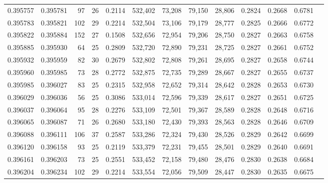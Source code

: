 \begin{tabular}{rrrrrrrrrrrrr}
0.395757 & 0.395781 &    97 &  26 &                                     0.2114 & 532,402 &  73,208 &  79,150 &  28,806 & 0.2824 & 0.2668 & 0.6781 \\
0.395783 & 0.395821 &   102 &  29 &                                     0.2214 & 532,504 &  73,106 &  79,179 &  28,777 & 0.2825 & 0.2666 & 0.6772 \\
0.395822 & 0.395884 &   152 &  27 &                                     0.1508 & 532,656 &  72,954 &  79,206 &  28,750 & 0.2827 & 0.2663 & 0.6758 \\
0.395885 & 0.395930 &    64 &  25 &                                     0.2809 & 532,720 &  72,890 &  79,231 &  28,725 & 0.2827 & 0.2661 & 0.6752 \\
0.395932 & 0.395959 &    82 &  30 &                                     0.2679 & 532,802 &  72,808 &  79,261 &  28,695 & 0.2827 & 0.2658 & 0.6744 \\
0.395960 & 0.395985 &    73 &  28 &                                     0.2772 & 532,875 &  72,735 &  79,289 &  28,667 & 0.2827 & 0.2655 & 0.6737 \\
0.395985 & 0.396027 &    83 &  25 &                                     0.2315 & 532,958 &  72,652 &  79,314 &  28,642 & 0.2828 & 0.2653 & 0.6730 \\
0.396029 & 0.396036 &    56 &  25 &                                     0.3086 & 533,014 &  72,596 &  79,339 &  28,617 & 0.2827 & 0.2651 & 0.6725 \\
0.396037 & 0.396064 &    95 &  28 &                                     0.2276 & 533,109 &  72,501 &  79,367 &  28,589 & 0.2828 & 0.2648 & 0.6716 \\
0.396065 & 0.396087 &    71 &  26 &                                     0.2680 & 533,180 &  72,430 &  79,393 &  28,563 & 0.2828 & 0.2646 & 0.6709 \\
0.396088 & 0.396111 &   106 &  37 &                                     0.2587 & 533,286 &  72,324 &  79,430 &  28,526 & 0.2829 & 0.2642 & 0.6699 \\
0.396120 & 0.396158 &    93 &  25 &                                     0.2119 & 533,379 &  72,231 &  79,455 &  28,501 & 0.2829 & 0.2640 & 0.6691 \\
0.396161 & 0.396203 &    73 &  25 &                                     0.2551 & 533,452 &  72,158 &  79,480 &  28,476 & 0.2830 & 0.2638 & 0.6684 \\
0.396204 & 0.396234 &   102 &  29 &                                     0.2214 & 533,554 &  72,056 &  79,509 &  28,447 & 0.2830 & 0.2635 & 0.6675 \\

\end{tabular}
